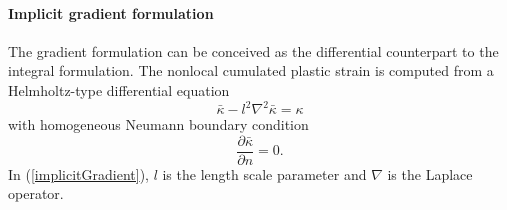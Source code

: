 \documentclass[a4paper]{article}
\begin{document}
\paragraph{Implicit gradient formulation}
The gradient formulation can be conceived as the differential counterpart to the integral formulation. The nonlocal cumulated plastic strain is computed from a Helmholtz-type differential equation 
\begin{equation}\label{implicitGradient}
\bar{\kappa} - l^2\nabla^2\bar{\kappa} = \kappa
\end{equation}
with homogeneous Neumann boundary condition
\begin{equation}\label{neumannBC}
\frac{\partial\bar{\kappa}}{\partial n} = 0.
\end{equation} In (\ref{implicitGradient}), $l$ is the length scale parameter and $\nabla$ is the Laplace operator. 
\end{document}
